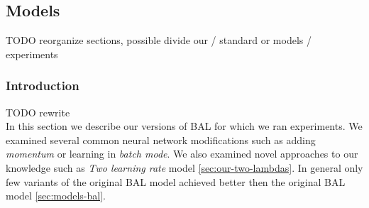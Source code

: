 \subsection{Models}
\label{sec:our-models} 
TODO reorganize sections, possible divide our / standard or models / experiments\\ 

\subsubsection*{Introduction} 
TODO rewrite  \\
In this section we describe our versions of BAL for which we ran experiments. We examined several common neural network modifications such as adding \emph{momentum} or learning in \emph{batch mode}. We also examined novel approaches to our knowledge such as \emph{Two learning rate} model \ref{sec:our-two-lambdas}. In general only few variants of the original BAL model achieved better then the original BAL model \ref{sec:models-bal}. 


 

 



 

